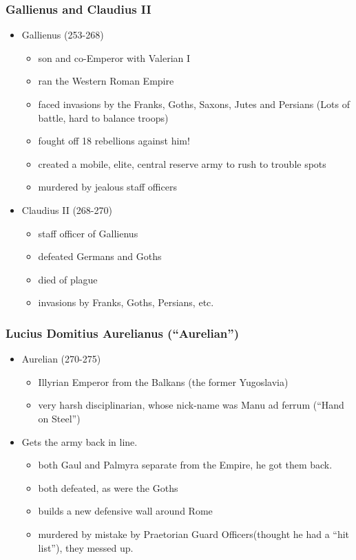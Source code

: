 \documentclass[12pt, twoside]{article}
\begin{document}
\subsubsection{Gallienus and Claudius II}
\begin{itemize}
\item Gallienus (253-268)
	\begin{itemize}
	\item son and co-Emperor with Valerian I
	\item ran the Western Roman Empire
	\item faced invasions by the Franks, Goths, Saxons, Jutes and Persians (Lots of battle, hard to balance troops)
	\item fought off 18 rebellions against him!
	\item created a mobile, elite, central reserve army to rush to trouble spots
	\item murdered by jealous staff officers
	\end{itemize}
\item Claudius II (268-270)
	\begin{itemize}
	\item staff officer of Gallienus
	\item defeated Germans and Goths
	\item died of plague
	\item invasions by Franks, Goths, Persians, etc.
	\end{itemize}
\end{itemize}

\subsubsection{Lucius Domitius Aurelianus (“Aurelian”)}
\begin{itemize}
\item Aurelian (270-275)
	\begin{itemize}
	\item Illyrian Emperor from the Balkans (the former Yugoslavia)
	\item very harsh disciplinarian, whose nick-name was Manu ad ferrum (“Hand on Steel”)
	\end{itemize}
\item Gets the army back in line.
	\begin{itemize}
	\item both Gaul and Palmyra separate from the Empire, he got them back.
	\item both defeated, as were the Goths
	\item builds a new defensive wall around Rome
	\item murdered by mistake by Praetorian Guard Officers(thought he had a “hit list”), they messed up.
	\end{itemize}
\end{itemize}
\end{document}
